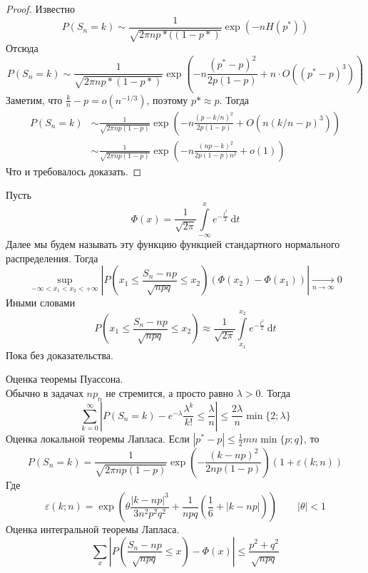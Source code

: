 \documentclass{article}
\let\eps\varepsilon
\begin{document}
    \begin{proof}
        Известно
        $$
        P(S_n=k)\sim\frac1{\sqrt{2\pi np*((1-p*)}}\exp(-nH(p^*))
        $$
        Отсюда
        $$
        P(S_n=k)\sim\frac1{\sqrt{2\pi np*(1-p*)}}\exp(-n\frac{(p^*-p)^2}{2p(1-p)}+n\cdot O((p^*-p)^3))
        $$
        Заметим, что $\frac kn-p=o(n^{-1/3})$, поэтому $p* \approx p$. Тогда
        \begin{align*}
            P(S_n=k)&\sim\frac1{\sqrt{2\pi np(1-p)}}\exp\left(-n\frac{(p-k/n)^2}{2p(1-p)}+O(n(k/n-p)^3)\right)\\
             &\sim\frac1{\sqrt{2\pi np(1-p)}}\exp\left(-n\frac{(np-k)^2}{2p(1-p)n^2}+o(1)\right)
        \end{align*}
        Что и требовалось доказать.
    \end{proof}
    \begin{theorem}
        Пусть
        $$
        \Phi(x)=\frac1{\sqrt{2\pi}}\int\limits_{-\infty}^xe^{-\frac{t^2}2}~\mathrm dt
        $$
        Далее мы будем называть эту функцию функцией стандартного нормального распределения. Тогда
        $$
        \sup\limits_{-\infty<x_1<x_2<+\infty}\left|P\left(x_1\leqslant\frac{S_n-np}{\sqrt{npq}}\leqslant x_2\right)(\Phi(x_2)-\Phi(x_1))\right|\underset{n\to\infty}\longrightarrow0
        $$
        Иными словами
        $$
        P\left(x_1\leqslant\frac{S_n-np}{\sqrt{npq}}\leqslant x_2\right)\approx\frac1{\sqrt{2\pi}}\int\limits_{x_1}^{x_2}e^{-\frac{t^2}2}~\mathrm dt
        $$
        Пока без доказательства.
    \end{theorem}
    \begin{remark}
        Оценка теоремы Пуассона.\\
        Обычно в задачах $np_n$ не стремится, а просто равно $\lambda>0$. Тогда
        $$
        \sum\limits_{k=0}^\infty \left|P(S_n=k)-e^{-\lambda}\frac{\lambda^k}{k!}\leqslant\frac\lambda n\right|\leqslant\frac{2\lambda}n\min\{2;\lambda\}
        $$
        Оценка локальной теоремы Лапласа. Если $|p^*-p|\leqslant \frac12 mn\min\{p;q\}$, то
        $$
        P(S_n=k)=\frac1{\sqrt{2\pi np(1-p)}}\exp\left(-\frac{(k-np)^2}{2np(1-p)}\right)(1+\eps(k;n))
        $$
        Где
        $$
        \eps(k;n)=\exp\left(\theta\frac{|k-np|^3}{3n^2p^2q^2}+\frac1{npq}\left(\frac16+|k-np|\right)\right)\qquad |\theta|<1
        $$
        Оценка интегральной теоремы Лапласа.
        $$
        \sum\limits_x\left|P\left(\frac{S_n-np}{\sqrt{npq}}\leqslant x\right)-\Phi(x)\right|\leqslant\frac{p^2+q^2}{\sqrt{npq}}
        $$
    \end{remark}
\end{document}
